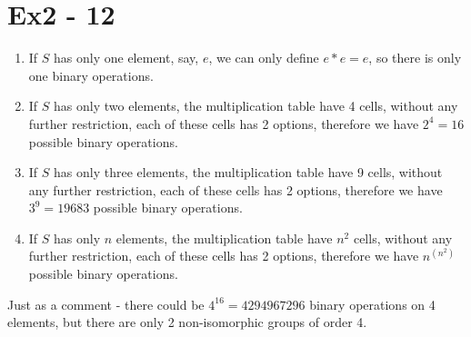 \section*{Ex2 - 12}
\begin{enumerate}
\item{If $ S $ has only one element, say, $ e $, we can only define $ e * e = e $, so there is only one binary operations.}
\item{If $ S $ has only two elements, the multiplication table have 4 cells, without any further restriction, each of these cells has 2 options, therefore we have $ 2^4 = 16 $ possible binary operations.}
\item{If $ S $ has only three elements, the multiplication table have 9 cells, without any further restriction, each of these cells has 2 options, therefore we have $ 3^9 = 19683 $ possible binary operations.}
\item{If $ S $ has only $ n $ elements, the multiplication table have $ n^2 $ cells, without any further restriction, each of these cells has 2 options, therefore we have $ n^(n^2) $ possible binary operations.}
\end{enumerate}

Just as a comment - there could be $ 4^{16} = 4294967296 $ binary operations on 4 elements, but there are only 2 non-isomorphic groups of order 4.